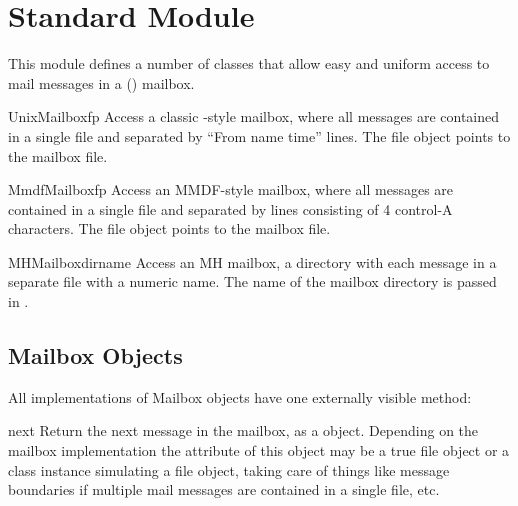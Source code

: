\section{Standard Module }
\label{module-mailbox}


This module defines a number of classes that allow easy and uniform
access to mail messages in a (\UNIX{}) mailbox.

\begin{classdesc}{UnixMailbox}{fp}
Access a classic \UNIX{}-style mailbox, where all messages are contained
in a single file and separated by ``From name time'' lines.
The file object  points to the mailbox file.
\end{classdesc}

\begin{classdesc}{MmdfMailbox}{fp}
Access an MMDF-style mailbox, where all messages are contained
in a single file and separated by lines consisting of 4 control-A
characters.  The file object  points to the mailbox file.
\end{classdesc}

\begin{classdesc}{MHMailbox}{dirname}
Access an MH mailbox, a directory with each message in a separate
file with a numeric name.
The name of the mailbox directory is passed in .
\end{classdesc}

\subsection{Mailbox Objects}
\label{mailbox-objects}

All implementations of Mailbox objects have one externally visible
method:

\begin{methoddesc}[mailbox]{next}{}
Return the next message in the mailbox, as a  object.
Depending on the mailbox implementation the  attribute of this
object may be a true file object or a class instance simulating a file object,
taking care of things like message boundaries if multiple mail messages are
contained in a single file, etc.
\end{methoddesc}

